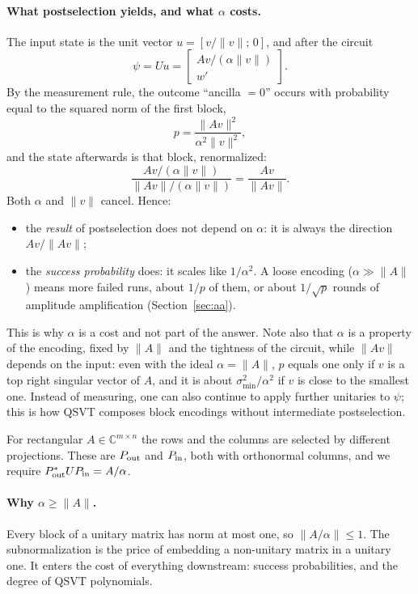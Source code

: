 \documentclass[11pt,a4paper]{article}
\newcommand{\C}{\mathbb{C}}
\begin{document}
\paragraph{What postselection yields, and what $\alpha$ costs.}\label{sec:post} The input state is
the unit vector $u=[v/\|v\|;\,0]$, and after the circuit
\[
\psi=Uu=\begin{bmatrix}Av/(\alpha\|v\|)\\ w'\end{bmatrix}.
\]
By the measurement rule, the outcome ``ancilla $=0$'' occurs with probability
equal to the squared norm of the first block,
\[
p=\frac{\|Av\|^2}{\alpha^2\|v\|^2},
\]
and the state afterwards is that block, renormalized:
\[
\frac{Av/(\alpha\|v\|)}{\|Av\|/(\alpha\|v\|)}=\frac{Av}{\|Av\|}.
\]
Both $\alpha$ and $\|v\|$ cancel. Hence:
\begin{itemize}
\item the \emph{result} of postselection does not depend on $\alpha$: it is always
  the direction $Av/\|Av\|$;
\item the \emph{success probability} does: it scales like $1/\alpha^2$. A loose
  encoding ($\alpha\gg\|A\|$) means more failed runs, about $1/p$ of them, or
  about $1/\sqrt p$ rounds of amplitude amplification
  (Section~\ref{sec:aa}).
\end{itemize}
This is why $\alpha$ is a cost and not part of the answer. Note also that $\alpha$
is a property of the encoding, fixed by $\|A\|$ and the tightness of the
circuit, while $\|Av\|$ depends on the input: even with the ideal $\alpha=\|A\|$,
$p$ equals one only if $v$ is a top right singular vector of $A$, and it is
about $\sigma_{\min}^2/\alpha^2$ if $v$ is close to the smallest one. Instead of
measuring, one can also continue to apply further unitaries to $\psi$; this is
how QSVT composes block encodings without intermediate postselection.

For rectangular $A\in\C^{m\times n}$ the rows and the columns are selected by
different projections. These are $P_{\rm out}$ and $P_{\rm in}$, both with
orthonormal columns, and we require $P_{\rm out}^*UP_{\rm in}=A/\alpha$.

\paragraph{Why $\alpha\ge\|A\|$.} Every block of a unitary matrix has norm at
most one, so $\|A/\alpha\|\le1$. The subnormalization is the price of
embedding a non-unitary matrix in a unitary one. It enters the cost of
everything downstream: success probabilities, and the degree of QSVT
polynomials.
\end{document}

